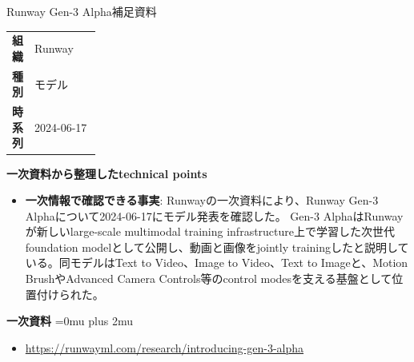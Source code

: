 \begin{technicalnote}{Runway Gen-3 Alpha}{補足資料}
\begingroup
\begin{tabularx}{\linewidth}{@{}>{\bfseries}p{0.22\linewidth}X@{}}
組織 & Runway \\
種別 & モデル \\
時系列 & 2024-06-17 \\
\end{tabularx}
\smallskip
\begin{minipage}{\linewidth}
{\bfseries 一次資料から整理したtechnical points}
\begin{itemize}[leftmargin=1.5em,itemsep=0.35em]
\item \textbf{一次情報で確認できる事実}: Runwayの一次資料により、Runway Gen-3 Alphaについて2024-06-17にモデル発表を確認した。 Gen-3 AlphaはRunwayが新しいlarge-scale multimodal training infrastructure上で学習した次世代foundation modelとして公開し、動画と画像をjointly trainingしたと説明している。同モデルはText to Video、Image to Video、Text to Imageと、Motion BrushやAdvanced Camera Controls等のcontrol modesを支える基盤として位置付けられた。
\end{itemize}
\begin{minipage}{\linewidth}
\begin{samepage}
{\bfseries 一次資料}
\begingroup\sloppy
\Urlmuskip=0mu plus 2mu\relax
\begin{itemize}[leftmargin=1.5em,itemsep=0.25em]
\item {\scriptsize\url{https://runwayml.com/research/introducing-gen-3-alpha}}
\end{itemize}
\endgroup
\end{samepage}
\end{minipage}
\end{minipage}
\endgroup
\end{technicalnote}
\medskip

